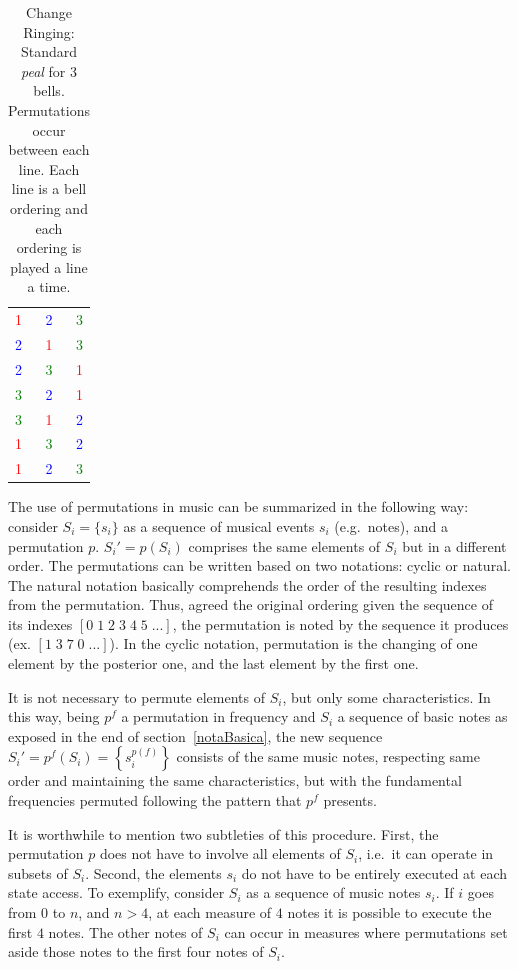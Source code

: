 \documentclass[
 aip,
 jmp,
 amsmath,amssymb,
 reprint,
]{revtex4-1}
\begin{document}
\begin{table}[htpq!]
\centering
\caption{Change Ringing: Standard \emph{peal} for 3 bells. Permutations
occur between each line. Each line is a bell ordering and each ordering is played
        a line a time.} 
\begin{tabular}{l c r}
\textcolor{red}{1} & \textcolor{blue}{2} & \textcolor{green}{3} \\
\textcolor{blue}{2} & \textcolor{red}{1} & \textcolor{green}{3} \\
\textcolor{blue}{2} & \textcolor{green}{3} & \textcolor{red}{1} \\
\textcolor{green}{3} & \textcolor{blue}{2} & \textcolor{red}{1} \\
\textcolor{green}{3} & \textcolor{red}{1} & \textcolor{blue}{2} \\
\textcolor{red}{1} & \textcolor{green}{3} & \textcolor{blue}{2} \\
\textcolor{red}{1} & \textcolor{blue}{2} & \textcolor{green}{3}
\end{tabular}
\label{tab:change}
\end{table}

The use of permutations in music can be summarized in the following way:
consider $S_i=\{s_i\}$ as a sequence of musical events $s_i$ (e.g.\ notes), and a
permutation $p$. $S_i'=p(S_i)$ comprises the same elements of $S_i$ but in a
different order. The permutations can be written based on two notations: cyclic or
natural. The natural notation basically comprehends the order of the resulting indexes from
the permutation. Thus, agreed the original ordering given the sequence of its
indexes $[0\;1\;2\;3\;4\;5\;...]$, the permutation is noted by the sequence it
produces (ex. $[1\;3\;7\;0\;...]$). In the cyclic notation, permutation is the
changing of one element by the posterior one, and the last element by the first one.

It is not necessary to permute elements of $S_i$, but only some
characteristics. In this way, being $p^f$ a permutation in frequency and $S_i$ a
sequence of basic notes as exposed in the end of section~\ref{notaBasica}, the
new sequence $S_i'=p^f(S_i)=\left\{s_i^{p(f)}\right\}$ consists of the same
music notes, respecting same order and maintaining the same characteristics, but with the
fundamental frequencies permuted following the pattern that $p^f$ presents.

It is worthwhile to mention two subtleties of this procedure. First, the permutation $p$ does not have to involve all elements of $S_i$, i.e.\ it can operate in subsets of $S_i$. Second,  the elements $s_i$ do not have to be entirely executed at each state access. To exemplify,
consider $S_i$ as a sequence of music notes $s_i$. If $i$ goes from $0$ to $n$, and
$n>4$, at each measure of $4$ notes it is possible to execute the first $4$
notes. The other notes of $S_i$ can occur in measures where permutations set
aside those notes to the first four notes of $S_i$.
\end{document}
